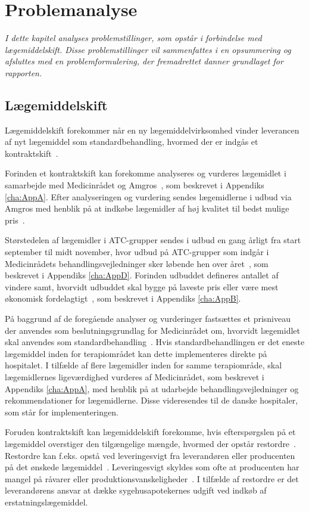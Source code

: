 \chapter{Problemanalyse}
\textit{I dette kapitel analyses problemstillinger, som opstår i forbindelse med lægemiddelskift. Disse problemstillinger vil sammenfattes i en opsummering og afsluttes med en problemformulering, der fremadrettet danner  grundlaget for rapporten.}

\section{Lægemiddelskift}
Lægemiddelskift forekommer når en ny lægemiddelvirksomhed vinder leverancen af nyt lægemiddel som standardbehandling, hvormed der er indgås et kontraktskift~\citep{Amgros2015}. 

Forinden et kontraktskift kan forekomme analyseres og vurderes lægemidlet i samarbejde med Medicinrådet og Amgros~\citep{DanskeRegioner2016}, som beskrevet i Appendiks \ref{cha:AppA}. Efter analyseringen og vurdering sendes lægemidlerne i udbud via Amgros med henblik på at indkøbe lægemidler af høj kvalitet til bedst mulige pris~\citep{Sygehusapoteket2017}.

Størstedelen af lægemidler i ATC-grupper sendes i udbud en gang årligt fra start september til midt november, hvor udbud på ATC-grupper som indgår i Medicinrådets behandlingsvejledninger sker løbende hen over året~\citep{Sygehusapoteket2017}, som beskrevet i Appendiks \ref{cha:AppD}.
Forinden udbuddet defineres antallet af vindere samt, hvorvidt udbuddet skal bygge på laveste pris eller være mest økonomisk fordelagtigt~\citep{Amgros2018a}, som beskrevet i Appendiks \ref{cha:AppB}.

På baggrund af de foregående analyser og vurderinger fastsættes et prisniveau der anvendes som beslutningsgrundlag for Medicinrådet om, hvorvidt lægemidlet skal anvendes som standardbehandling~\citep{DanskeRegioner2016}. Hvis standardbehandlingen er det eneste lægemiddel inden for terapiområdet kan dette implementeres direkte på hospitalet. I tilfælde af flere lægemidler inden for samme terapiområde, skal lægemidlernes ligeværdighed vurderes af Medicinrådet, som beskrevet i Appendiks \ref{cha:AppA}, med henblik på at udarbejde behandlingsvejledninger og rekommendationer for lægemidlerne. Disse videresendes til de danske hospitaler, som står for implementeringen.~\citep{DanskeRegioner2016}

Foruden kontraktskift kan lægemiddelskift forekomme, hvis efterspørgslen på et lægemiddel overstiger den tilgængelige mængde, hvormed der opstår restordre~\citep{Amgros2015}. Restordre kan f.eks. opstå ved leveringesvigt fra leverandøren eller producenten på det ønskede lægemiddel~\citep{Amgros2017, Laegemiddelinformaion2017}. Leveringesvigt skyldes som ofte at producenten har mangel på råvarer eller produktionsvanskeligheder~\citep{Amgros2017, Laegemiddelinformaion2017}. I tilfælde  af restordre er det leverandørens ansvar at dække sygehusapotekernes udgift ved indkøb af erstatningslægemiddel.~\citep{Laegemiddelinformaion2017, Amgros2017}

